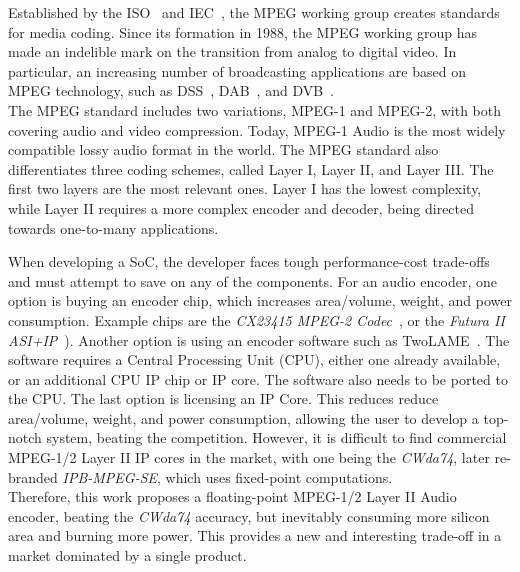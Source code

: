 
Established by the ISO~\cite{iso} and IEC~\cite{iec}, the MPEG working group creates standards for media coding. Since its formation in 1988, the MPEG working group has made an indelible mark on the transition from analog to digital video. In particular, an increasing number of broadcasting applications are based on MPEG technology, such as DSS~\cite{dss}, DAB~\cite{dab}, and DVB~\cite{dvb}.\\
The MPEG standard includes two variations, MPEG-1 and MPEG-2, with both covering audio and video compression. Today, MPEG-1 Audio is the most widely compatible lossy audio format in the world. The MPEG standard also differentiates three coding schemes, called Layer I, Layer II, and Layer III.  The first two layers are the most relevant ones. Layer I has the lowest complexity, while Layer II requires a more complex encoder and decoder, being directed towards one-to-many applications.

When developing a SoC, the developer faces tough performance-cost trade-offs and must attempt to save on any of the components. For an audio encoder, one option is buying an encoder chip, which increases area/volume, weight, and power consumption. Example chips are the \textit{CX23415 MPEG-2 Codec}~\cite{cx23415}, or the \textit{Futura II ASI+IP}~\cite{futura}). Another option is using an encoder software such as TwoLAME~\cite{twolame}. The software requires a Central Processing Unit (CPU), either one already available, or an additional CPU IP chip or IP core. The software also needs to be ported to the CPU. The last option is licensing an IP Core. This reduces reduce area/volume, weight, and power consumption, allowing the user to develop a top-notch system, beating the competition. However, it is difficult to find commercial MPEG-1/2 Layer II IP cores in the market, with one being the \textit{CWda74}, later re-branded \textit{IPB-MPEG-SE}, which uses fixed-point computations.\\
Therefore, this work proposes a floating-point MPEG-1/2 Layer II Audio encoder, beating the \textit{CWda74} accuracy, but inevitably consuming more silicon area and burning more power. This provides a new and interesting trade-off in a market dominated by a single product.

